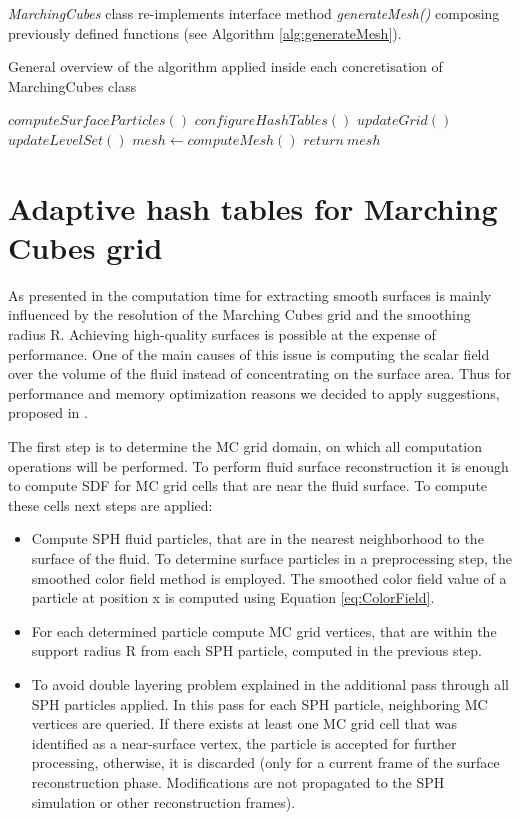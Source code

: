 \emph{MarchingCubes} class re-implements interface method \emph{generateMesh()} composing previously defined functions (see Algorithm \ref{alg:generateMesh}).

\begin{algorithm}
	\scriptsize
	\caption{General overview of the algorithm applied inside each concretisation of MarchingCubes class}
	\label{alg:generateMesh}
	\begin{algorithmic}
		\State $computeSurfaceParticles()$
		\State $configureHashTables()$
		\State $updateGrid()$
		\State $updateLevelSet()$
		\State $mesh \gets computeMesh()$ 
		\State $return\ mesh$
	\end{algorithmic}
\end{algorithm}

\section{Adaptive hash tables for Marching Cubes grid}
As presented in \cite{Akinchi} the computation time for extracting smooth surfaces is mainly influenced by the resolution of the Marching Cubes grid and the smoothing radius R. Achieving high-quality surfaces is possible at the expense of performance. One of the main causes of this issue is computing the scalar field over the volume of the fluid instead of concentrating on the surface area. Thus for performance and memory optimization reasons we decided to apply suggestions, proposed in \cite{Akinchi}.

The first step is to determine the MC grid domain, on which all computation operations will be performed. To perform fluid surface reconstruction it is enough to compute SDF for MC grid cells that are near the fluid surface. To compute these cells next steps are applied:
\begin{itemize}
		\item Compute SPH fluid particles, that are in the nearest neighborhood to the surface of the fluid. To determine surface particles in a preprocessing step, the smoothed color field method \cite{ColorField} is employed.  The smoothed color field value of a particle at position x is computed using Equation \ref{eq:ColorField}.
		\item For each determined particle compute MC grid vertices, that are within the support radius R from each SPH particle, computed in the previous step.
		\item To avoid double layering problem explained in the \cite{Akinchi} additional pass through all SPH particles applied. In this pass for each SPH particle, neighboring MC vertices are queried. If there exists at least one MC grid cell that was identified as a near-surface vertex, the particle is accepted for further processing, otherwise, it is discarded (only for a current frame of the surface reconstruction phase. Modifications are not propagated to the SPH simulation or other reconstruction frames).
\end{itemize}

